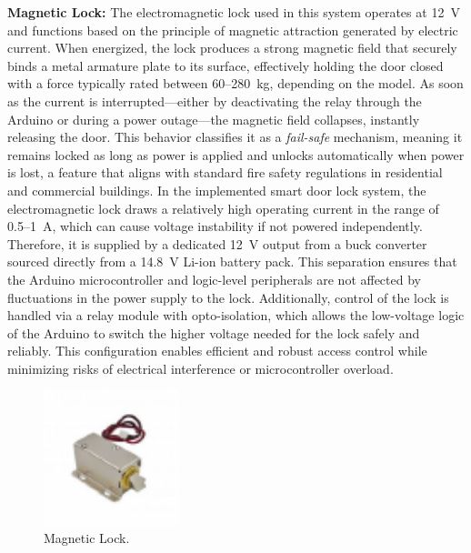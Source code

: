 \documentclass[conference, onecolumn]{IEEEtran}
\begin{document}
 \textbf{Magnetic Lock:} The electromagnetic lock used in this system operates at 12~V and functions based on the principle of magnetic attraction generated by electric current. When energized, the lock produces a strong magnetic field that securely binds a metal armature plate to its surface, effectively holding the door closed with a force typically rated between 60--280~kg, depending on the model. As soon as the current is interrupted—either by deactivating the relay through the Arduino or during a power outage—the magnetic field collapses, instantly releasing the door. This behavior classifies it as a \textit{fail-safe} mechanism, meaning it remains locked as long as power is applied and unlocks automatically when power is lost, a feature that aligns with standard fire safety regulations in residential and commercial buildings. In the implemented smart door lock system, the electromagnetic lock draws a relatively high operating current in the range of 0.5--1~A, which can cause voltage instability if not powered independently. Therefore, it is supplied by a dedicated 12~V output from a buck converter sourced directly from a 14.8~V Li-ion battery pack. This separation ensures that the Arduino microcontroller and logic-level peripherals are not affected by fluctuations in the power supply to the lock. Additionally, control of the lock is handled via a relay module with opto-isolation, which allows the low-voltage logic of the Arduino to switch the higher voltage needed for the lock safely and reliably. This configuration enables efficient and robust access control while minimizing risks of electrical interference or microcontroller overload.
 
\begin{figure}[H]
	\centering
	\includegraphics[width=0.35\textwidth]{Magnetic.pdf}
	\caption{Magnetic Lock.}
	\label{fig8}
\end{figure}
\end{document}
